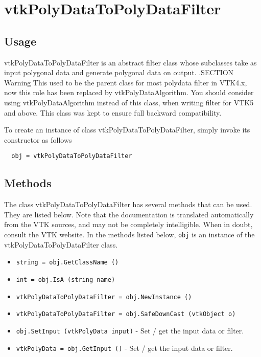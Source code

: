 \section{vtkPolyDataToPolyDataFilter}

\subsection{Usage}

 vtkPolyDataToPolyDataFilter is an abstract filter class whose subclasses
 take as input polygonal data and generate polygonal data on output.
 .SECTION Warning
 This used to be the parent class for most polydata filter in VTK4.x, now 
 this role has been replaced by vtkPolyDataAlgorithm. You should consider
 using vtkPolyDataAlgorithm instead of this class, 
 when writing filter for VTK5 and above.
 This class was kept to ensure full backward compatibility.

To create an instance of class vtkPolyDataToPolyDataFilter, simply
invoke its constructor as follows
\begin{verbatim}
  obj = vtkPolyDataToPolyDataFilter
\end{verbatim}
\subsection{Methods}

The class vtkPolyDataToPolyDataFilter has several methods that can be used.
  They are listed below.
Note that the documentation is translated automatically from the VTK sources,
and may not be completely intelligible.  When in doubt, consult the VTK website.
In the methods listed below, \verb|obj| is an instance of the vtkPolyDataToPolyDataFilter class.
\begin{itemize}
\item  \verb|string = obj.GetClassName ()|

\item  \verb|int = obj.IsA (string name)|

\item  \verb|vtkPolyDataToPolyDataFilter = obj.NewInstance ()|

\item  \verb|vtkPolyDataToPolyDataFilter = obj.SafeDownCast (vtkObject o)|

\item  \verb|obj.SetInput (vtkPolyData input)| -  Set / get the input data or filter.

\item  \verb|vtkPolyData = obj.GetInput ()| -  Set / get the input data or filter.

\end{itemize}
